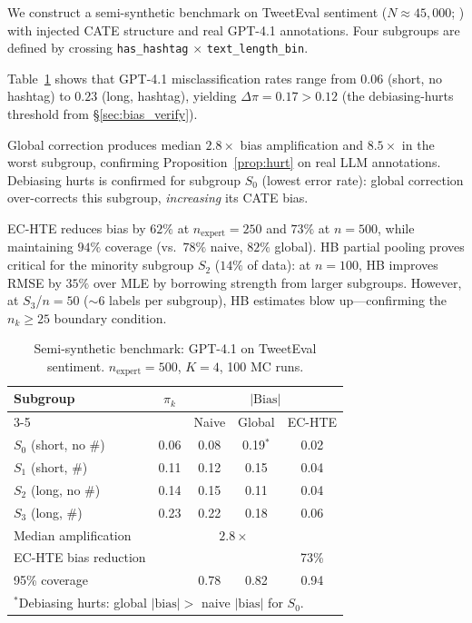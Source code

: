 \documentclass[11pt,twocolumn]{article}
\theoremstyle{remark}
\newcommand{\abs}[1]{\lvert #1 \rvert}
\begin{document}
We construct a semi-synthetic benchmark on TweetEval sentiment ($N{\approx}45{,}000$; \cite{barbieri2020tweeteval}) with injected CATE structure and real GPT-4.1 annotations.
Four subgroups are defined by crossing \texttt{has\_hashtag} $\times$ \texttt{text\_length\_bin}.

Table~\ref{tab:semisynthetic} shows that GPT-4.1 misclassification rates range from $0.06$ (short, no hashtag) to $0.23$ (long, hashtag), yielding $\Delta\pi = 0.17 > 0.12$ (the debiasing-hurts threshold from \S\ref{sec:bias_verify}).

Global correction produces median $2.8\times$ bias amplification and $8.5\times$ in the worst subgroup, confirming Proposition~\ref{prop:hurt} on real LLM annotations.
Debiasing hurts is confirmed for subgroup $S_0$ (lowest error rate): global correction over-corrects this subgroup, \emph{increasing} its CATE bias.

EC-HTE reduces bias by $62\%$ at $n_{\mathrm{expert}}{=}250$ and $73\%$ at $n{=}500$, while maintaining $94\%$ coverage (vs.\ $78\%$ naive, $82\%$ global).
HB partial pooling proves critical for the minority subgroup $S_2$ ($14\%$ of data): at $n{=}100$, HB improves RMSE by $35\%$ over MLE by borrowing strength from larger subgroups.
However, at $S_3$/$n{=}50$ (${\sim}6$ labels per subgroup), HB estimates blow up---confirming the $n_k \geq 25$ boundary condition.

\begin{table}[t]
\centering
\small
\caption{Semi-synthetic benchmark: GPT-4.1 on TweetEval sentiment. $n_{\mathrm{expert}}{=}500$, $K{=}4$, 100 MC runs.}
\label{tab:semisynthetic}
\begin{tabular}{lcccc}
\toprule
Subgroup & $\pi_k$ & \multicolumn{3}{c}{$\abs{\mathrm{Bias}}$} \\
\cmidrule(lr){3-5}
& & Naive & Global & EC-HTE \\
\midrule
$S_0$ (short, no \#) & 0.06 & 0.08 & 0.19$^*$ & 0.02 \\
$S_1$ (short, \#) & 0.11 & 0.12 & 0.15 & 0.04 \\
$S_2$ (long, no \#) & 0.14 & 0.15 & 0.11 & 0.04 \\
$S_3$ (long, \#) & 0.23 & 0.22 & 0.18 & 0.06 \\
\midrule
Median amplification & & \multicolumn{2}{c}{$2.8\times$} \\
EC-HTE bias reduction & & & & 73\% \\
95\% coverage & & 0.78 & 0.82 & 0.94 \\
\bottomrule
\multicolumn{5}{l}{\scriptsize $^*$Debiasing hurts: global $\abs{\text{bias}} >$ naive $\abs{\text{bias}}$ for $S_0$.}
\end{tabular}
\end{table}
\end{document}
